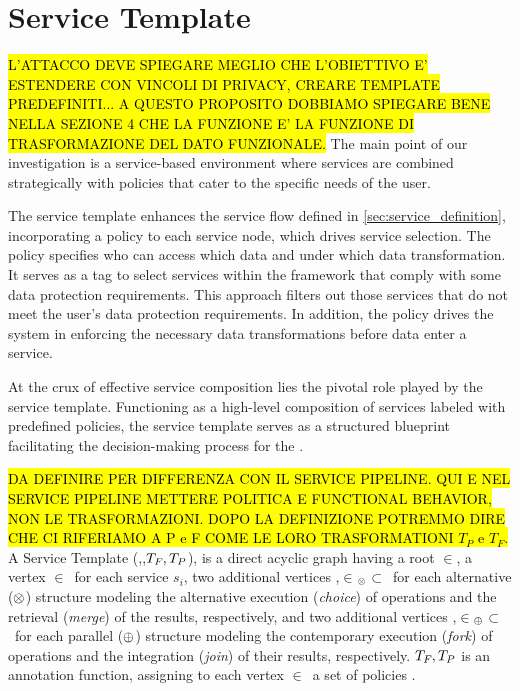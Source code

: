 


\section{Service Template}\label{sec:service_template}
\hl{L'ATTACCO DEVE SPIEGARE MEGLIO CHE L'OBIETTIVO E' ESTENDERE CON VINCOLI DI PRIVACY, CREARE TEMPLATE PREDEFINITI... A QUESTO PROPOSITO DOBBIAMO SPIEGARE BENE NELLA SEZIONE 4 CHE LA FUNZIONE E' LA FUNZIONE DI TRASFORMAZIONE DEL DATO FUNZIONALE.}
The main point of our investigation is a service-based environment where services are combined strategically with policies that cater to the specific needs of the user.

The service template enhances the service flow defined in \cref{sec:service_definition}, incorporating a policy to each service node, which drives service selection.
The policy specifies who can access which data and under which data transformation. It serves as a tag to select services within the framework that comply with some data protection requirements.
This approach filters out those services that do not meet the user's data protection requirements.
In addition, the policy drives the system in enforcing the necessary data transformations before data enter a service.

At the crux of effective service composition lies the pivotal role played by the service template.
Functioning as a high-level composition of services labeled with predefined policies,
the service template serves as a structured blueprint facilitating the decision-making process for the  \user.
\begin{definition} \label{def:pipeline}
  \hl{DA DEFINIRE PER DIFFERENZA CON IL SERVICE PIPELINE. QUI E NEL SERVICE PIPELINE METTERE POLITICA E FUNCTIONAL BEHAVIOR, NON LE TRASFORMAZIONI. DOPO LA DEFINIZIONE POTREMMO DIRE CHE CI RIFERIAMO A P e F COME LE LORO TRASFORMATIONI $T_P$ e $T_F$.}
  A Service Template \T(\V,\E,$T_{F_{}},T_P{}$), is a direct acyclic graph having a root $\in$\V, a vertex $\in$\V\ for each service $s_i$,
  two additional vertices ,$\in$\V$_{\otimes}$$\subset$\V\ for each alternative ($\otimes$) structure modeling the alternative execution (\emph{choice}) of operations and the retrieval (\emph{merge}) of the results,
        respectively, and two additional vertices ,$\in$\V$_{\oplus}$$\subset$\V\ for each parallel ($\oplus$) structure modeling the contemporary execution (\emph{fork}) of operations and the integration (\emph{join}) of their results, respectively. $T_{F_{}},T_P{}$ is an annotation function, assigning to each vertex $\in$\V\ a set of policies .
\end{definition}


